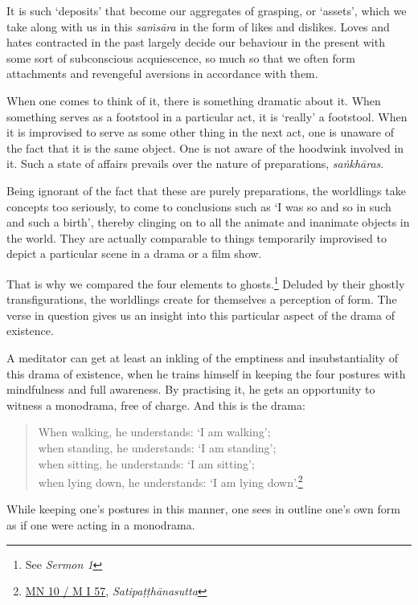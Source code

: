 It is such `deposits' that become our aggregates of grasping, or `assets', which we take along with us in this \emph{saṁsāra} in the form of likes and dislikes. Loves and hates contracted in the past largely decide our behaviour in the present with some sort of subconscious acquiescence, so much so that we often form attachments and revengeful aversions in accordance with them.

When one comes to think of it, there is something dramatic about it. When something serves as a footstool in a particular act, it is `really' a footstool. When it is improvised to serve as some other thing in the next act, one is unaware of the fact that it is the same object. One is not aware of the hoodwink involved in it. Such a state of affairs prevails over the nature of preparations, \emph{saṅkhāras}.

Being ignorant of the fact that these are purely preparations, the worldlings take concepts too seriously, to come to conclusions such as `I was so and so in such and such a birth', thereby clinging on to all the animate and inanimate objects in the world. They are actually comparable to things temporarily improvised to depict a particular scene in a drama or a film show.

That is why we compared the four elements to ghosts.\footnote{See \emph{Sermon 1}} Deluded by their ghostly transfigurations, the worldlings create for themselves a perception of form. The verse in question gives us an insight into this particular aspect of the drama of existence.

A meditator can get at least an inkling of the emptiness and insubstantiality of this drama of existence, when he trains himself in keeping the four postures with mindfulness and full awareness. By practising it, he gets an opportunity to witness a monodrama, free of charge. And this is the drama:

\begin{quote}
When walking, he understands: `I am walking';\\
when standing, he understands: `I am standing';\\
when sitting, he understands: `I am sitting';\\
when lying down, he understands: `I am lying down'.\footnote{\href{https://suttacentral.net/mn10/pli/ms}{MN 10 / M I 57}, \emph{Satipaṭṭhānasutta}}
\end{quote}

While keeping one's postures in this manner, one sees in outline one's own form as if one were acting in a monodrama.


